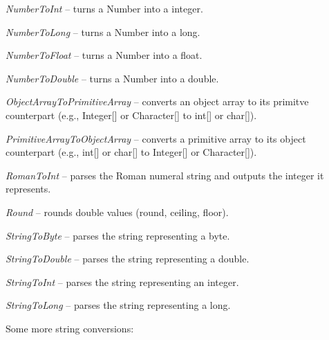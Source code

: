 \begin{tight_itemize}
	\item \textit{NumberToInt} -- turns a Number into a integer.
	\item \textit{NumberToLong} -- turns a Number into a long.
	\item \textit{NumberToFloat} -- turns a Number into a float.
	\item \textit{NumberToDouble} -- turns a Number into a double.
	\item \textit{ObjectArrayToPrimitiveArray} -- converts an object array to
	its primitve counterpart (e.g., Integer[] or Character[] to int[] or char[]).
	\item \textit{PrimitiveArrayToObjectArray} -- converts a primitive array to
	its object counterpart (e.g., int[] or char[] to Integer[] or Character[]).
	\item \textit{RomanToInt} -- parses the Roman numeral string and outputs the integer it represents.
	\item \textit{Round} -- rounds double values (round, ceiling, floor).
	\item \textit{StringToByte} -- parses the string representing a byte.
	\item \textit{StringToDouble} -- parses the string representing a double.
	\item \textit{StringToInt} -- parses the string representing an integer.
	\item \textit{StringToLong} -- parses the string representing a long.
\end{tight_itemize}
Some more string conversions:
